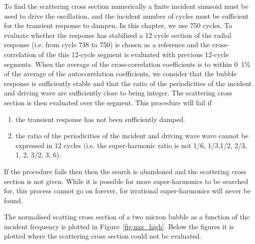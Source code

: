 \documentclass[10pt, fleqn,draft,showtrims,oldfontcommands]{article} %
\newcommand{\figref}[1]{Figure~\ref{fig:#1}}
\begin{document}
To find the scattering cross section  numerically 
a finite incident sinusoid must be used to drive the oscillation,
and the incident number of cycles must be sufficient for the transient response to dampen.
In this chapter, we use 750 cycles.
To evaluate whether the response has stabilised
 a 12 cycle section of the radial response  (i.e. from cycle 738 to 750) is chosen as a reference 
and the cross-correlation of the this 12-cycle segment is evaluated with previous 12-cycle segments.
When the average of the cross-correlation coefficients is to within \unit{0.1}\% of the average of the autocorrelation coefficients,
we consider that the bubble response is sufficiently stable
and that the ratio of the periodicities of the incident and driving wave are sufficiently close to being integer.
The scattering cross section is then evaluated over the segment.
This procedure will fail if 
\begin{enumerate}
\item the transient response has not been sufficiently damped.
\item the ratio of the periodicities of the incident and driving wave wave cannot be expressed in 12 cycles
(i.e. the super-harmonic ratio is not  1/6, 1/3,1/2, 2/3, 1, 2, 3/2, 3, 6).
\end{enumerate}
If the procedure fails then then the search is abandoned and the scattering cross section is not given.
While it is possible for more super-harmonics to be searched for,
this process cannot go on forever, for irrational super-harmonics will never be found.

The normalised scatting cross section of a two micron bubble
as a function of the incident frequency is plotted in  \figref{nxs_high}.
Below the figures it is 
plotted  where the scattering cross section could not be evaluated.

\end{document}
